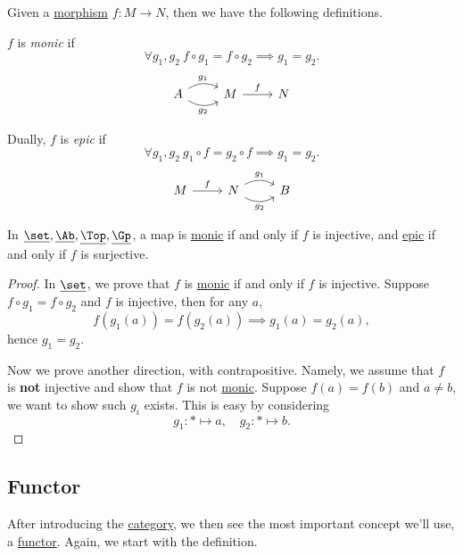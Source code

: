 \begin{definition*}
	Given a \hyperref[def:morphism]{morphism} \(f\colon M\to N\), then we have the following definitions.
	\begin{definition}[Monic]\label{def:monic}
		\(f\) is \emph{monic} if
		\[
			\forall g_1, g_2\ f\circ g_1 = f\circ g_2 \implies g_1 = g_2.
		\]
		\[
			\begin{tikzcd}
				A\ar[r, bend left, "g_1"]\ar[r, bend right, "g_2"']& M \ar[r, "f"]& N
			\end{tikzcd}
		\]
	\end{definition}
	\begin{definition}[Epic]\label{def:epic}
		Dually, \(f\) is \emph{epic} if
		\[
			\forall g_1, g_2\ g_{1} \circ f = g_2 \circ f \implies g_1 = g_2.
		\]
		\[
			\begin{tikzcd}
				M\ar[r, "f"]& N\ar[r, bend left, "g_1"]\ar[r, bend right, "g_2"']& B
			\end{tikzcd}
		\]
	\end{definition}
\end{definition*}

\begin{lemma}
	In \(\underline{\set}, \underline{\Ab}, \underline{\Top}, \underline{\Gp}\), a map is \hyperref[def:monic]{monic} if and only if \(f\) is injective, and \hyperref[def:epic]{epic} if and only if \(f\) is surjective.
\end{lemma}
\begin{proof}
	In \(\underline{\set}\), we prove that \(f\) is \hyperref[def:monic]{monic} if and only if \(f\) is injective. Suppose \(f\circ g_1 = f\circ g_2\) and \(f\) is injective, then for any \(a\),
	\[
		f(g_1(a)) = f(g_2(a))\implies g_1(a) = g_2(a),
	\]
	hence \(g_1 = g_2\).

	Now we prove another direction, with contrapositive. Namely, we assume that \(f\) is \textbf{not} injective and show that \(f\) is not \hyperref[def:monic]{monic}. Suppose \(f(a) = f(b)\) and \(a\neq b\), we want to show such \(g_{i}\) exists. This is easy by considering
	\[
		g_1\colon \ast\mapsto a,\quad g_2\colon \ast\mapsto b.
	\]
\end{proof}

\subsection{Functor}
After introducing the \hyperref[def:category]{category}, we then see the most important concept we'll use, a \hyperref[def:functor]{functor}. Again, we start with the definition.


